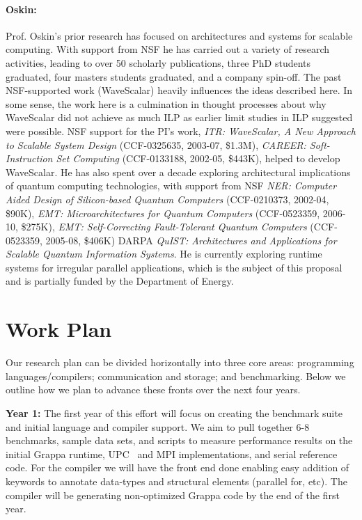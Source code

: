 \paragraph{Oskin:} Prof. Oskin's prior research has focused on architectures and systems for scalable computing.  With support from NSF he has carried out a variety of research activities, leading to over 50 scholarly publications, three PhD students graduated, four masters students graduated, and a company spin-off.  The past NSF-supported work (WaveScalar) heavily influences the ideas described here. In some sense, the work here is a culmination in thought processes about why WaveScalar did not achieve as much ILP as earlier limit studies in ILP suggested were possible.  NSF support for the PI's work, {\em ITR: WaveScalar, A New Approach to Scalable System Design} (CCF-0325635, 2003-07, \$1.3M), {\em CAREER: Soft-Instruction Set Computing} (CCF-0133188, 2002-05, \$443K), helped to develop WaveScalar.  He has also spent over a decade exploring architectural implications of quantum computing technologies, with support from NSF {\em NER: Computer Aided Design of Silicon-based Quantum Computers} (CCF-0210373, 2002-04, \$90K), {\em EMT: Microarchitectures for Quantum Computers} (CCF-0523359, 2006-10, \$275K), {\em EMT: Self-Correcting Fault-Tolerant Quantum Computers} (CCF-0523359, 2005-08, \$406K) DARPA {\em QuIST: Architectures and Applications for Scalable Quantum Information Systems}.  He is currently exploring runtime systems for irregular parallel applications, which is the subject of this proposal and is partially funded by the Department of Energy.

\section{Work Plan}
\label{sec:plan}

Our research plan can be divided horizontally into three core areas: programming languages/compilers; communication and storage; and benchmarking. Below we outline how we plan to advance these fronts over the next four years.

\vspace{2ex}


\noindent\textbf{Year 1:} The first year of this effort will focus on creating the benchmark suite and initial language and compiler support.  We aim to pull together 6-8 benchmarks, sample data sets, and scripts to measure performance results on the initial Grappa runtime, UPC~\cite{upc:2005} and MPI implementations, and serial reference code.  For the compiler we will have the front end done enabling easy addition of keywords to annotate data-types and structural elements (parallel for, etc).  The compiler will be generating non-optimized Grappa code by the end of the first year.


